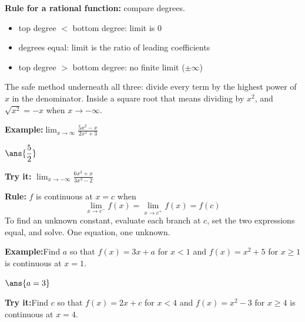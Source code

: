 \documentclass[12pt]{article}
\begin{document}
\begin{formulabox}
\textbf{Rule for a rational function:} compare degrees.
\begin{itemize}[leftmargin=1.2cm, itemsep=1pt, topsep=2pt]
  \item top degree $<$ bottom degree: limit is $0$
  \item degrees equal: limit is the ratio of leading coefficients
  \item top degree $>$ bottom degree: no finite limit ($\pm\infty$)
\end{itemize}
The safe method underneath all three: divide every term by the highest power
of $x$ in the denominator. Inside a square root that means dividing by $x^2$,
and $\sqrt{x^2} = -x$ when $x \to -\infty$.
\end{formulabox}
\begin{examplebox}
\textbf{Example:}\quad $\displaystyle \lim_{x \to \infty} \frac{5x^2-x}{2x^2+3}$
\par
$\ans{\dfrac{5}{2}}$
\end{examplebox}
\begin{tryitbox}
\textbf{Try it:}\quad
$\displaystyle \lim_{x \to -\infty} \frac{6x^3+x}{3x^3-2}$\\[2pt]
\end{tryitbox}

\begin{formulabox}
\textbf{Rule:} $f$ is continuous at $x = c$ when
\[ \lim_{x \to c^{-}} f(x) = \lim_{x \to c^{+}} f(x) = f(c) \]
To find an unknown constant, evaluate each branch at $c$, set the two
expressions equal, and solve. One equation, one unknown.
\end{formulabox}
\begin{examplebox}
\textbf{Example:}\quad Find $a$ so that $f(x) = 3x + a$ for $x < 1$ and
$f(x) = x^2 + 5$ for $x \ge 1$ is continuous at $x = 1$.
\par
$\ans{a = 3}$
\end{examplebox}
\begin{tryitbox}
\textbf{Try it:}\quad Find $c$ so that $f(x) = 2x + c$ for $x < 4$ and
$f(x) = x^2 - 3$ for $x \ge 4$ is continuous at $x = 4$.\\[2pt]
\end{tryitbox}
\end{document}
